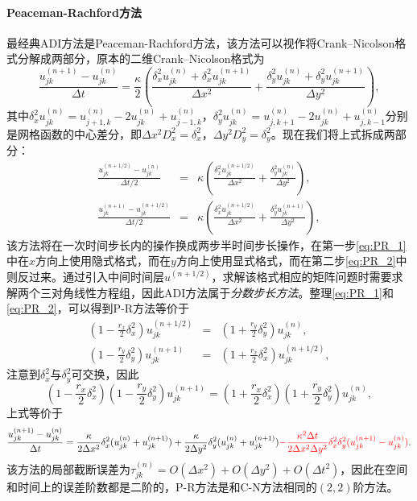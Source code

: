 \documentclass[a4paper,10pt]{ctexart}
\begin{document}
\paragraph*{Peaceman-Rachford方法}
最经典ADI方法是Peaceman-Rachford方法，该方法可以视作将Crank–Nicolson格式分解成两部分，原本的二维Crank–Nicolson格式为
\[
    \frac{u^{(n+1)}_{jk}-u^{(n)}_{jk}}{\Delta t} = \frac{\kappa}{2}\left( \frac{\delta_x^2u^{(n)}_{jk}+\delta_x^2u^{(n+1)}_{jk}}{\Delta x^2} + \frac{\delta_y^2u^{(n)}_{jk}+\delta_y^2u^{(n+1)}_{jk}}{\Delta y^2} \right) ,
\]
其中$ \delta_x^2 u^{(n)}_{jk} = u^{(n)}_{j+1,k}-2u^{(n)}_{jk}+u^{(n)}_{j-1,k} $，$ \delta_y^2 u^{(n)}_{jk} = u^{(n)}_{j,k+1}-2u^{(n)}_{jk}+u^{(n)}_{j,k-1} $分别是网格函数的中心差分，即$ \Delta x^2 D_x^2 = \delta_x^2 $，$ \Delta y^2 D_y^2 = \delta_y^2 $。现在我们将上式拆成两部分：
\begin{eqnarray}
    \frac{u^{(n+1/2)}_{jk}-u^{(n)}_{jk}}{\Delta t/2} &=&\kappa \left( \frac{\delta_x^2u^{(n+1 / 2)}_{jk}}{\Delta x^2} + \frac{\delta_y^2u^{(n)}_{jk}}{\Delta y^2} \right),\label{eq:PR_1}\\
    \frac{u^{(n+1)}_{jk}-u^{(n+1/2)}_{jk}}{\Delta t/2} &=&\kappa \left( \frac{\delta_x^2u^{(n+1 / 2)}_{jk}}{\Delta x^2} + \frac{\delta_y^2u^{(n+1)}_{jk}}{\Delta y^2} \right),\label{eq:PR_2}
\end{eqnarray}
该方法将在一次时间步长内的操作换成两步半时间步长操作，在第一步\eqref{eq:PR_1}中在$ x $方向上使用隐式格式，而在$ y $方向上使用显式格式，而在第二步\eqref{eq:PR_2}中则反过来。通过引入中间时间层$ u^{(n+1/2)} $，求解该格式相应的矩阵问题时需要求解两个三对角线性方程组，因此ADI方法属于\emph{分数步长方法}。整理\eqref{eq:PR_1}和\eqref{eq:PR_2}，可以得到P-R方法等价于
\begin{eqnarray}
    \left( 1-\frac{r_x}{2}\delta_x^2 \right) u^{(n+1/2)}_{jk} &=& \left( 1+\frac{r_y}{2}\delta_y^2 \right) u^{(n)}_{jk},\\
    \left( 1-\frac{r_y}{2}\delta_y^2 \right) u^{(n+1)}_{jk} &=& \left( 1+\frac{r_x}{2}\delta_x^2 \right) u^{(n+1/2)}_{jk},
\end{eqnarray}
注意到$ \delta_x^2 $与$ \delta_y^2 $可交换，因此
\begin{equation}\label{eq:PR}
    \left( 1-\frac{r_x}{2}\delta_x^2 \right)\left( 1-\frac{r_y}{2}\delta_y^2 \right) u^{(n+1)}_{jk} = \left( 1+\frac{r_x}{2}\delta_x^2 \right)\left( 1+\frac{r_y}{2}\delta_y^2 \right) u^{(n)}_{jk},
\end{equation}
上式等价于
\begin{equation}
    \frac{u^{(n+1)}_{jk}-u^{(n)}_{jk}}{\Delta t} = \frac{\kappa}{2\Delta x^2}\delta_x^2(u^{(n)}_{jk}+u^{(n+1)}_{jk}) + \frac{\kappa}{2\Delta y^2}\delta_y^2(u^{(n)}_{jk}+u^{(n+1)}_{jk}) \textcolor{red}{- \frac{\kappa^2\Delta t}{2\Delta x^2\Delta y^2}\delta_x^2\delta_y^2(u^{(n+1)}_{jk}-u^{(n)}_{jk})}.
\end{equation}
该方法的局部截断误差为$ \tau^{(n)}_{jk} = O(\Delta x^2)+O(\Delta y^2)+O(\Delta t^2) $，因此在空间和时间上的误差阶数都是二阶的，P-R方法是和C-N方法相同的$ (2,2) $阶方法。
\end{document}
